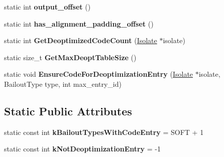 \begin{DoxyCompactItemize}
\item 
\hypertarget{classv8_1_1internal_1_1_deoptimizer_a210da11b9db7b0d1fab095ff6d9d122d}{}static int {\bfseries output\+\_\+offset} ()\label{classv8_1_1internal_1_1_deoptimizer_a210da11b9db7b0d1fab095ff6d9d122d}

\item 
\hypertarget{classv8_1_1internal_1_1_deoptimizer_a1e2ac92a8ffc4e6724089385134b4cd7}{}static int {\bfseries has\+\_\+alignment\+\_\+padding\+\_\+offset} ()\label{classv8_1_1internal_1_1_deoptimizer_a1e2ac92a8ffc4e6724089385134b4cd7}

\item 
\hypertarget{classv8_1_1internal_1_1_deoptimizer_a880004c229c7157a3d87ce9ea312f889}{}static int {\bfseries Get\+Deoptimized\+Code\+Count} (\hyperlink{classv8_1_1internal_1_1_isolate}{Isolate} $\ast$isolate)\label{classv8_1_1internal_1_1_deoptimizer_a880004c229c7157a3d87ce9ea312f889}

\item 
\hypertarget{classv8_1_1internal_1_1_deoptimizer_aebc80140c294c7bb1a5ddb6c562148f2}{}static size\+\_\+t {\bfseries Get\+Max\+Deopt\+Table\+Size} ()\label{classv8_1_1internal_1_1_deoptimizer_aebc80140c294c7bb1a5ddb6c562148f2}

\item 
\hypertarget{classv8_1_1internal_1_1_deoptimizer_a5a550dbf313047056fc3d1bf6ebe36e9}{}static void {\bfseries Ensure\+Code\+For\+Deoptimization\+Entry} (\hyperlink{classv8_1_1internal_1_1_isolate}{Isolate} $\ast$isolate, Bailout\+Type type, int max\+\_\+entry\+\_\+id)\label{classv8_1_1internal_1_1_deoptimizer_a5a550dbf313047056fc3d1bf6ebe36e9}

\end{DoxyCompactItemize}
\subsection*{Static Public Attributes}
\begin{DoxyCompactItemize}
\item 
\hypertarget{classv8_1_1internal_1_1_deoptimizer_a1141631c683a0efa5b0f3b0c3e1c70a5}{}static const int {\bfseries k\+Bailout\+Types\+With\+Code\+Entry} = S\+O\+F\+T + 1\label{classv8_1_1internal_1_1_deoptimizer_a1141631c683a0efa5b0f3b0c3e1c70a5}

\item 
\hypertarget{classv8_1_1internal_1_1_deoptimizer_a670edfccf46146bdfbb870239c84f0a9}{}static const int {\bfseries k\+Not\+Deoptimization\+Entry} = -\/1\label{classv8_1_1internal_1_1_deoptimizer_a670edfccf46146bdfbb870239c84f0a9}

\end{DoxyCompactItemize}
